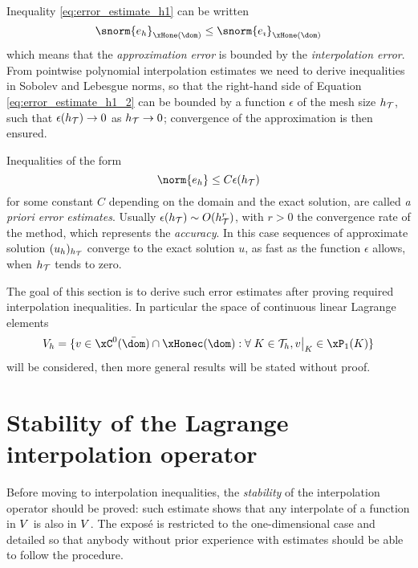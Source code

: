 \medskip
Inequality \eqref{eq:error_estimate_h1} can be written
\begin{equation}\label{eq:error_estimate_h1_2}
\snorm{e_h}_{\xHone(\dom)} \leq \snorm{e_\imath}_{\xHone(\dom)}
\end{equation}
which means that the \textit{approximation error} is bounded by the \textit{interpolation error}.
From pointwise polynomial interpolation estimates we need to derive inequalities in Sobolev and Lebesgue norms, so that the right-hand side of Equation \eqref{eq:error_estimate_h1_2} can be bounded by a function $\epsilon$ of the mesh size $h_{\mathcal T}$, such that $\epsilon(h_{\mathcal T}) \rightarrow 0$ as $h_{\mathcal T} \rightarrow 0$; convergence of the approximation is then ensured.

\medskip
Inequalities of the form
\begin{equation*}
\norm{e_h} \leq C \epsilon(\sizeT)
\end{equation*}
for some constant $C$ depending on the domain and the exact solution, are called \textit{a priori error estimates}.
Usually $\epsilon(h_{\mathcal T}) \sim O(h_{\mathcal T}^r)$, with $r > 0$ the convergence rate of the method, which represents the \textit{accuracy}.
In this case sequences of approximate solution $(u_h)_{h_{\mathcal T}}$ converge to the exact solution $u$, as fast as the function $\epsilon$ allows, when $h_{\mathcal T}$ tends to zero.

\medskip
The goal of this section is to derive such error estimates after proving required interpolation inequalities.
In particular the space of continuous linear Lagrange elements
\begin{equation}\label{sp:lagrangeP1}
\xVh = \lbrace v \in \xC^0(\bar\dom)\cap\xHonec(\dom) : \forany K \in \meshT, \Restrict{v}{K} \in \xPone(K) \rbrace
\end{equation}
will be considered, then more general results will be stated without proof.

\section{Stability of the Lagrange interpolation operator}

Before moving to interpolation inequalities, the \textit{stability} of the interpolation operator should be proved: such estimate shows that any interpolate of a function in ${V}$ is also in ${V}$.
The exposé is restricted to the one-dimensional case and detailed so that anybody without prior experience with estimates should be able to follow the procedure.

